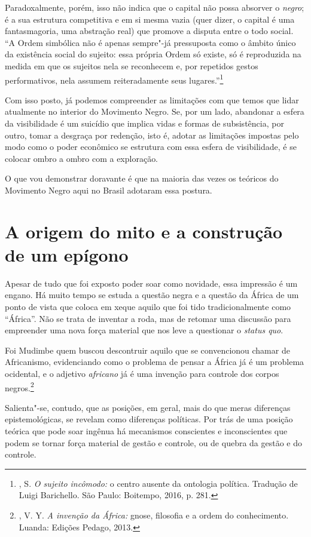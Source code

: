 Paradoxalmente, porém, isso não indica que o capital não possa absorver
o \emph{negro}; é a sua estrutura competitiva e em si mesma vazia (quer
dizer, o capital é uma fantasmagoria, uma abstração real) que promove a
disputa entre o todo social. ``A Ordem simbólica não é apenas sempre"-já
pressuposta como o âmbito único da existência social do sujeito: essa
própria Ordem só existe, só é reproduzida na medida em que os sujeitos
nela se reconhecem e, por repetidos gestos performativos, nela assumem
reiteradamente seus lugares.''\footnote{, S. \emph{O sujeito
  incômodo:} o centro ausente da ontologia política. Tradução de Luigi
  Barichello. São Paulo: Boitempo, 2016, p. 281.}

Com isso posto, já podemos compreender as limitações com que temos que
lidar atualmente no interior do Movimento Negro. Se, por um lado,
abandonar a esfera da visibilidade é um suicídio que implica vidas e
formas de subsistência, por outro, tomar a desgraça por redenção, isto
é, adotar as limitações impostas pelo modo como o poder econômico se
estrutura com essa esfera de visibilidade, é se colocar ombro a ombro
com a exploração.

O que vou demonstrar doravante é que na maioria das vezes os teóricos do
Movimento Negro aqui no Brasil adotaram essa postura.

\chapter{A origem do mito e a construção de um epígono }

Apesar de tudo que foi exposto poder soar como novidade, essa impressão
é um engano. Há muito tempo se estuda a questão negra e a questão da
África de um ponto de vista que coloca em xeque aquilo que foi tido
tradicionalmente como ``África''. Não se trata de inventar a roda, mas
de retomar uma discussão para empreender uma nova força material que nos
leve a questionar o \emph{status quo}.

Foi Mudimbe quem buscou descontruir aquilo que se convencionou chamar de
Africanismo, evidenciando como o problema de pensar a África já é um
problema ocidental, e o adjetivo \emph{africano} já é uma invenção para
controle dos corpos negros.\footnote{, V. Y. \emph{A invenção da
  África:} gnose, filosofia e a ordem do conhecimento. Luanda: Edições
  Pedago, 2013.}

Salienta"-se, contudo, que as posições, em geral, mais do que meras
diferenças epistemológicas, se revelam como diferenças políticas. Por
trás de uma posição teórica que pode soar ingênua há mecanismos
conscientes e inconscientes que podem se tornar força material de gestão
e controle, ou de quebra da gestão e do controle.

